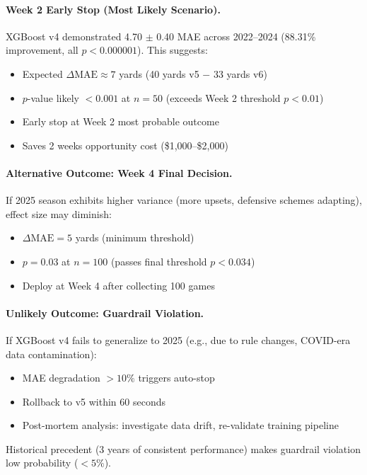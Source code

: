 \paragraph{Week 2 Early Stop (Most Likely Scenario).}
XGBoost v4 demonstrated 4.70 $\pm$ 0.40 MAE across 2022--2024 (88.31\% improvement, all $p < 0.000001$). This suggests:
\begin{itemize}[itemsep=2pt,parsep=0pt]
    \item Expected $\Delta\text{MAE} \approx 7$ yards (40 yards v5 $-$ 33 yards v6)
    \item $p$-value likely $< 0.001$ at $n = 50$ (exceeds Week 2 threshold $p < 0.01$)
    \item Early stop at Week 2 most probable outcome
    \item Saves 2 weeks opportunity cost (\$1,000--\$2,000)
\end{itemize}

\paragraph{Alternative Outcome: Week 4 Final Decision.}
If 2025 season exhibits higher variance (more upsets, defensive schemes adapting), effect size may diminish:
\begin{itemize}[itemsep=2pt,parsep=0pt]
    \item $\Delta\text{MAE} = 5$ yards (minimum threshold)
    \item $p = 0.03$ at $n = 100$ (passes final threshold $p < 0.034$)
    \item Deploy at Week 4 after collecting 100 games
\end{itemize}

\paragraph{Unlikely Outcome: Guardrail Violation.}
If XGBoost v4 fails to generalize to 2025 (e.g., due to rule changes, COVID-era data contamination):
\begin{itemize}[itemsep=2pt,parsep=0pt]
    \item MAE degradation $> 10\%$ triggers auto-stop
    \item Rollback to v5 within 60 seconds
    \item Post-mortem analysis: investigate data drift, re-validate training pipeline
\end{itemize}

Historical precedent (3 years of consistent performance) makes guardrail violation low probability ($< 5\%$).

